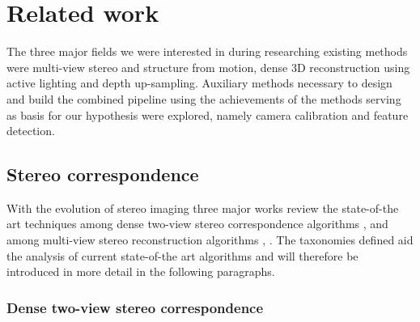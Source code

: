 \documentclass{ucl_thesis}
\begin{document}
\chapter{Related work} 
\label{chp:related_work}

\par The three major fields we were interested in during researching existing methods were multi-view stereo and structure from motion, dense 3D reconstruction using active lighting and depth up-sampling. Auxiliary methods necessary to design and build the combined pipeline using the achievements of the methods serving as basis for our hypothesis were explored, namely camera calibration and feature detection.

\section{Stereo correspondence}
With the evolution of stereo imaging three major works review the state-of-the art techniques among dense two-view stereo correspondence algorithms \cite{ScharsteinS02}, and among multi-view stereo reconstruction algorithms \cite{Seitz:2006}, \cite{Strecha:2008}. The taxonomies defined aid the analysis of current state-of-the art algorithms and will therefore be introduced in more detail in the following paragraphs.

\subsection{Dense two-view stereo correspondence} 
\label{subsub:densestereo}
\end{document}

